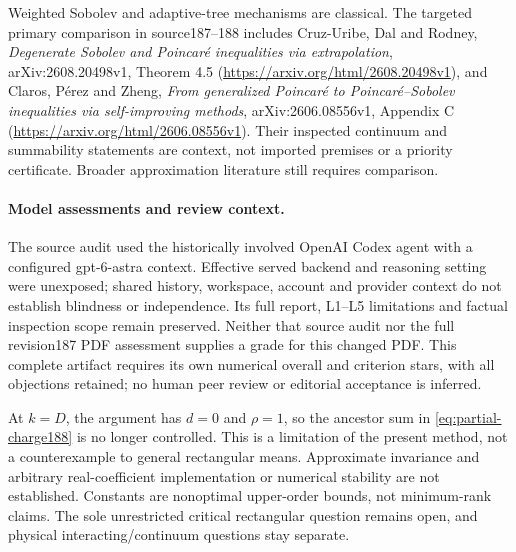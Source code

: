 Weighted Sobolev and adaptive-tree mechanisms are classical. The targeted
primary comparison in source187--188 includes Cruz-Uribe, Dal and Rodney,
\emph{Degenerate Sobolev and Poincar\'e inequalities via extrapolation},
arXiv:2608.20498v1, Theorem 4.5
(\url{https://arxiv.org/html/2608.20498v1}), and Claros, P\'erez and Zheng,
\emph{From generalized Poincar\'e to Poincar\'e--Sobolev inequalities via
self-improving methods}, arXiv:2606.08556v1, Appendix C
(\url{https://arxiv.org/html/2606.08556v1}). Their inspected continuum and
summability statements are context, not imported premises or a priority
certificate. Broader approximation literature still requires comparison.

\paragraph{Model assessments and review context.}
The source audit used the historically involved OpenAI Codex agent with a
configured gpt-6-astra context. Effective served backend and reasoning setting
were unexposed; shared history, workspace, account and provider context do not
establish blindness or independence. Its full report, L1--L5 limitations and
factual inspection scope remain preserved. Neither that source audit nor the
full revision187 PDF assessment supplies a grade for this changed PDF. This
complete artifact requires its own numerical overall and criterion stars,
with all objections retained; no human peer review or editorial acceptance
is inferred.

At $k=D$, the argument has $d=0$ and $\rho=1$, so the ancestor sum in
\eqref{eq:partial-charge188} is no longer controlled. This is a limitation
of the present method, not a counterexample to general rectangular means.
Approximate invariance and arbitrary real-coefficient implementation or
numerical stability are not established. Constants are nonoptimal upper-order
bounds, not minimum-rank claims. The sole unrestricted critical rectangular
question remains open, and physical interacting/continuum questions stay separate.
